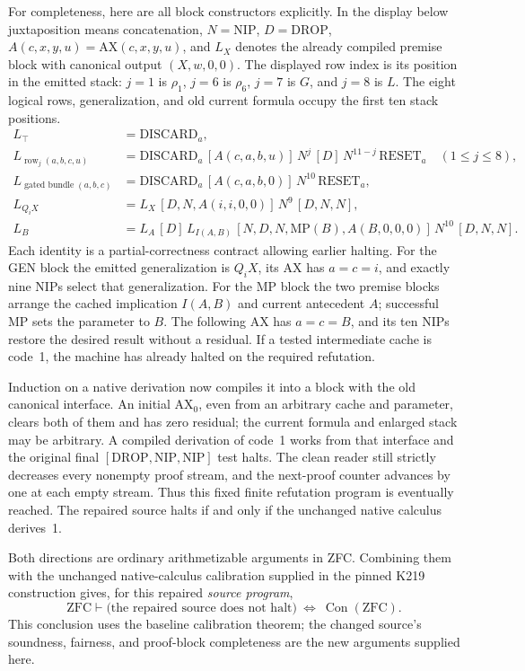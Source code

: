 For completeness, here are all block constructors explicitly.  In the
display below juxtaposition means concatenation, $N=\mathrm{NIP}$,
$D=\mathrm{DROP}$, $A(c,x,y,u)=\mathrm{AX}(c,x,y,u)$, and $L_X$ denotes
the already compiled premise block with canonical output $(X,w,0,0)$.
The displayed row index is its position in the emitted stack:
$j=1$ is $\rho_1$, $j=6$ is $\rho_6$, $j=7$ is $G$, and $j=8$ is $L$.
The eight logical rows, generalization, and old current formula occupy
the first ten stack positions.
\[
\begin{aligned}
L_{\top}
  &=\mathrm{DISCARD}_a,\\
L_{\operatorname{row}_j(a,b,c,u)}
  &=\mathrm{DISCARD}_a\,[A(c,a,b,u)]\,N^j\,[D]\,N^{11-j}
       \,\mathrm{RESET}_a \quad(1\leq j\leq8),\\
L_{\operatorname{gated\ bundle}(a,b,c)}
  &=\mathrm{DISCARD}_a\,[A(c,a,b,0)]\,N^{10}
       \,\mathrm{RESET}_a,\\
L_{Q_i X}
  &=L_X\,[D,N,A(i,i,0,0)]\,N^9\,[D,N,N],\\
L_B
  &=L_A\,[D]\,L_{I(A,B)}\,[N,D,N,\mathrm{MP}(B),A(B,0,0,0)]
       \,N^{10}\,[D,N,N].
\end{aligned}
\]
Each identity is a partial-correctness contract allowing earlier halting.
For the GEN block the emitted generalization is $Q_iX$, its AX has
$a=c=i$, and exactly nine NIPs select that generalization.  For the MP
block the two premise blocks arrange the cached implication $I(A,B)$
and current antecedent $A$; successful MP sets the parameter to $B$.
The following AX has $a=c=B$, and its ten NIPs restore the desired result
without a residual.  If a tested intermediate cache is code~1, the
machine has already halted on the required refutation.

Induction on a native derivation now compiles it into a block with the
old canonical interface.  An initial $\mathrm{AX}_0$, even from an
arbitrary cache and parameter, clears both of them and has zero residual;
the current formula and enlarged stack may be arbitrary.  A compiled
derivation of code~1 works from that interface and the original final
$[\mathrm{DROP},\mathrm{NIP},\mathrm{NIP}]$ test halts.  The clean reader still strictly decreases every
nonempty proof stream, and the next-proof counter advances by one at
each empty stream.  Thus this fixed finite refutation program is
eventually reached.  The repaired source halts if and only if the
unchanged native calculus derives~1.

Both directions are ordinary arithmetizable arguments in ZFC.  Combining
them with the unchanged native-calculus calibration supplied in the
pinned K219 construction gives, for this repaired \emph{source program},
\[
\mathrm{ZFC}\vdash
 \bigl(\text{the repaired source does not halt}\bigr)
 \ \Longleftrightarrow\ \operatorname{Con}(\mathrm{ZFC}).
\]
This conclusion uses the baseline calibration theorem; the changed
source's soundness, fairness, and proof-block completeness are the new
arguments supplied here.

